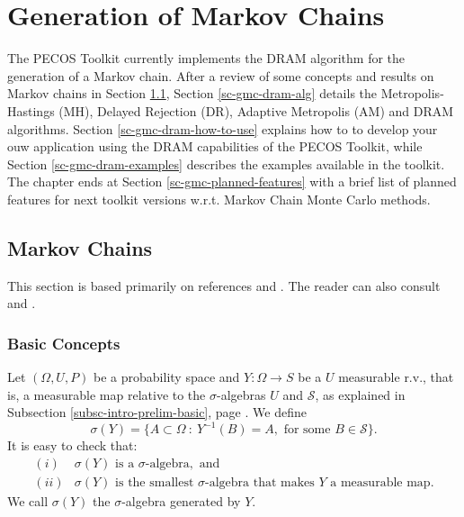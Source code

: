 \chapter{Generation of Markov Chains}\label{ch-gmc}
\thispagestyle{headings}

The PECOS Toolkit currently implements the DRAM algorithm \cite{HaLaMiSa06} for the generation of a Markov chain.
After a review of some concepts and results on Markov chains in Section \ref{sc-gmc-markov-chains},
Section \ref{sc-gmc-dram-alg} details the
Metropolis-Hastings (MH),
Delayed Rejection (DR),
Adaptive Metropolis (AM) and
DRAM algorithms.
Section \ref{sc-gmc-dram-how-to-use} explains how to to develop your ouw application using the DRAM capabilities of the PECOS Toolkit, while
Section \ref{sc-gmc-dram-examples} describes the examples available in the toolkit.
The chapter ends at Section \ref{sc-gmc-planned-features} with a brief list of planned features for next toolkit versions w.r.t. Markov Chain Monte Carlo methods.

\section{Markov Chains}\label{sc-gmc-markov-chains}

This section is based primarily on references \cite{Du05} and \cite{JaPr04}.
The reader can also consult \cite{KaSo05} and \cite{Ro96}.

\subsection{Basic Concepts}

Let $(\Omega,U,P)$ be a probability space and $Y:\Omega\rightarrow S$ be a $U$ measurable r.v.,
that is, a measurable map relative to the $\sigma$-algebras $U$ and $\mathcal{S}$,
as explained in Subsection \ref{subsc-intro-prelim-basic}, page \pageref{subsc-intro-prelim-basic}.
We define
\begin{equation*}
\sigma(Y) = \{A\subset\Omega~:~Y^{-1}(B)=A,\mbox{ for some }B\in\mathcal{S}\}.
\end{equation*}
It is easy to check that:
\[
\begin{array}{rl}
  (i) & \sigma(Y)\mbox{ is a }\sigma\mbox{-algebra},\mbox{ and}\\
 (ii) & \sigma(Y)\mbox{ is the smallest }\sigma\mbox{-algebra}\mbox{ that makes }Y\mbox{ a measurable map}.
\end{array}
\]
We call $\sigma(Y)$ the $\sigma$-algebra generated by $Y$.

